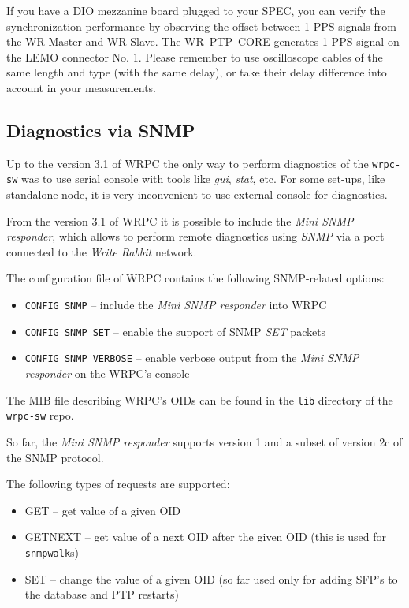\documentclass[a4paper, 12pt]{article}
\newcommand{\codeHook}[1]{\mbox{\ttfamily\MakeTextUppercase{#1}}}
\begin{document}
\vspace{1em}
If you have a \codeHook{dio} mezzanine board plugged to your \codeHook{spec}, you can verify
the synchronization performance by observing the offset between 1-PPS signals
from the \codeHook{wr} Master and \codeHook{wr} Slave. The \codeHook{wr ptp core} generates 1-PPS
signal on the LEMO connector No. 1. Please remember to use oscilloscope cables
of the same length and type (with the same delay), or take their delay
difference into account in your measurements.


\label{Diagnostics via SNMP}
\subsection{Diagnostics via SNMP}

Up to the version 3.1 of \codeHook{wrpc} the only way to perform diagnostics
of the \texttt{wrpc-sw} was to use serial console with tools like \textit{gui}, \textit{stat},
etc. For some set-ups, like standalone node, it is very inconvenient to use
external console for diagnostics.

From the version 3.1 of \codeHook{wrpc} it is possible to include the \textit{Mini
SNMP responder}, which allows to perform remote diagnostics using \textit{SNMP} via
a port connected to the \textit{Write Rabbit} network.

The configuration file of \codeHook{wrpc} contains the following
SNMP-related options:
\begin{itemize}
\item \texttt{CONFIG\_SNMP} -- include the \textit{Mini SNMP responder} into \codeHook{wrpc}
\item \texttt{CONFIG\_SNMP\_SET} -- enable the support of SNMP \textit{SET} packets
\item \texttt{CONFIG\_SNMP\_VERBOSE} -- enable verbose output from the \textit{Mini SNMP
      responder} on the \codeHook{wrpc}'s console
\end{itemize}

The MIB file describing \codeHook{wrpc}'s OIDs can be found in the \texttt{lib} directory
of the \texttt{wrpc-sw} repo.

So far, the \textit{Mini SNMP responder} supports version 1 and a subset of version
2c of the SNMP protocol.

The following types of requests are supported:
\begin{itemize}
   \item GET -- get value of a given OID
   \item GETNEXT -- get value of a next OID after the given OID (this is used
         for \texttt{snmpwalk}s)
   \item SET -- change the value of a given OID (so far used only for adding
         SFP's to the database and PTP restarts)
\end{itemize}
\end{document}
